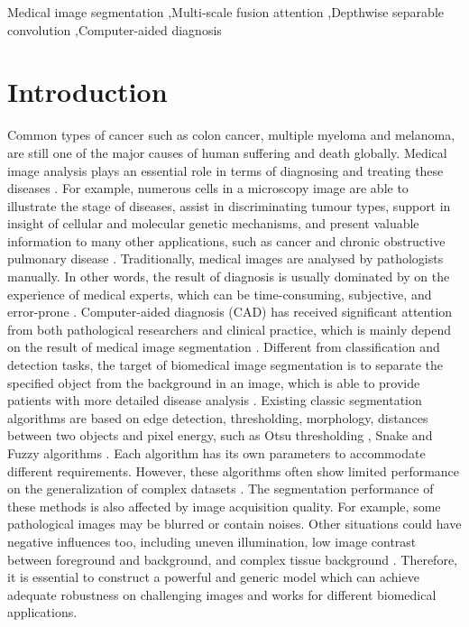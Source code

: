 \documentclass[a4paper,fleqn]{cas-dc}
\begin{document}
\begin{keywords}
Medical image segmentation \sep Multi-scale fusion attention \sep Depthwise separable convolution \sep Computer-aided diagnosis
\end{keywords}


\maketitle

\section{Introduction}

Common types of cancer such as colon cancer, multiple myeloma and melanoma, are still one of the major causes of human suffering and death globally. Medical image analysis plays an essential role in terms of diagnosing and treating these diseases \cite{ma2021understanding}. For example, numerous cells in a microscopy image are able to illustrate the stage of diseases, assist in discriminating tumour types, support in insight of cellular and molecular genetic mechanisms, and present valuable information to many other applications, such as cancer and chronic obstructive pulmonary disease \cite{coates2015tailoring}. Traditionally, medical images are analysed by pathologists manually. In other words, the result of diagnosis is usually dominated by on the experience of medical experts, which can be time-consuming, subjective, and error-prone \cite{chen2019learning}. Computer-aided diagnosis (CAD) has received significant attention from both pathological researchers and clinical practice, which is mainly depend on the result of medical image segmentation \cite{he2021deeply}. Different from classification and detection tasks, the target of biomedical image segmentation is to separate the specified object from the background in an image, which is able to provide patients with more detailed disease analysis \cite{zhou2019high}. Existing classic segmentation algorithms are based on edge detection, thresholding, morphology, distances between two objects and pixel energy, such as Otsu thresholding \cite{otsu1979threshold}, Snake \cite{kass1988snakes} and Fuzzy algorithms \cite{tizhoosh2005image}. Each algorithm has its own parameters to accommodate different requirements. However, these algorithms often show limited performance on the generalization of complex datasets \cite{riccio2018new}. The segmentation performance of these methods is also affected by image acquisition quality. For example, some pathological images may be blurred or contain noises. Other situations could have negative influences too, including uneven illumination, low image contrast between foreground and background, and complex tissue background \cite{feng2020cpfnet}. Therefore, it is essential to construct a powerful and generic model which can achieve adequate robustness on challenging images and works for different biomedical applications.
\end{document}
